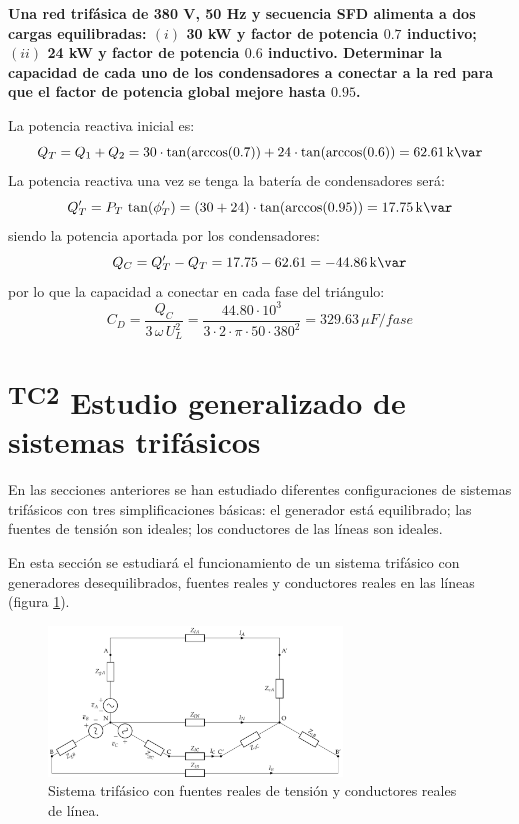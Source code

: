 \begin{example}\label{ex.compensacion_Q_trif}
  \textbf{Una red trifásica de 380 V, 50 Hz y secuencia SFD alimenta a
    dos cargas equilibradas: $(i)$ 30 kW y factor de potencia $0.7$
    inductivo; $(ii)$ 24 kW y factor de potencia $0.6$
    inductivo. Determinar la capacidad de cada uno de los
    condensadores a conectar a la red para que el factor de potencia
    global mejore hasta $0.95$.}
		    
  La potencia reactiva inicial es:
  \begin{equation*}
    Q_T=Q_1+Q_2=30\cdot \tan(\arccos(0.7))+24\cdot \tan(\arccos(0.6))=62.61\,\si{\kilo\var}
  \end{equation*}
  La potencia reactiva una vez se tenga la batería de condensadores
  será:
  \begin{equation*}
    Q_T'=P_T\,\tan(\phi_T')=(30+24)\cdot \tan(\arccos(0.95))=17.75\,\si{\kilo\var}
  \end{equation*}
  siendo la potencia aportada por los condensadores:
  \begin{equation*}
    Q_C=Q_T'-Q_T=17.75-62.61=-44.86\,\si{\kilo\var}
  \end{equation*}
  por lo que la capacidad a conectar en cada fase del triángulo:
  \begin{equation*}
    C_D=\dfrac{Q_C}{3\,\omega\,U_L^2}=\dfrac{44.80\cdot 10^3}{3\cdot 2\cdot \pi\cdot 50\cdot 380^2}=329.63\,\mu F/fase
  \end{equation*}
\end{example}

		 


\section{\textsuperscript{TC2} Estudio generalizado de sistemas trifásicos}
\label{sec:estudio-generalizado-trifasica}


En las secciones anteriores se han estudiado diferentes configuraciones de sistemas trifásicos con tres simplificaciones básicas: el generador está equilibrado; las fuentes de tensión son ideales; los conductores de las líneas son ideales.

En esta sección se estudiará el funcionamiento de un sistema trifásico con generadores desequilibrados, fuentes reales y conductores reales en las líneas (figura \ref{fig:sistema-trifasico-general}).

\begin{figure}[H]
  \centering
  \includegraphics[height=4cm]{../figs/CircuitoTrifasicaGeneralizado.pdf}
  \caption{Sistema trifásico con fuentes reales de tensión y conductores reales de línea.}
  \label{fig:sistema-trifasico-general}
\end{figure}


